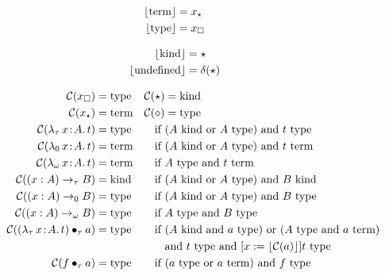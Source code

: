 
\begin{figure}
    \centering
    \begin{minipage}{0.5\textwidth}
        \begin{align*}
            \lfloor \!\!~\textnormal{term} \rfloor &= x_\star \\
            \lfloor \!\!~\textnormal{type} \rfloor &= x_\square
        \end{align*}
    \end{minipage}%
    \begin{minipage}{0.5\textwidth}
        \begin{align*}
            \lfloor \!\!~\textnormal{kind} \rfloor &= \star \\
            \lfloor \text{undefined} \rfloor &= \delta(\star)
        \end{align*}
    \end{minipage}
    \begin{align*}
        \mathcal{C}(x_\square) &=\!\! \ptype &\mathcal{C}(\star) &=\!\! \pkind\\
        \mathcal{C}(x_\star) &=\!\! \pterm &\mathcal{C}(\diamond) &=\!\! \ptype\\
        \mathcal{C}(\abs{\lambda_\tau}{x}{A}{t}) &=\!\! \ptype &\text{if }& (A\pkind \text{ or } A\ptype) \text{ and } t\ptype \\
        \mathcal{C}(\abs{\lambda_0}{x}{A}{t}) &=\!\! \pterm &\text{if }& (A\pkind \text{ or } A\ptype) \text{ and } t\pterm \\
        \mathcal{C}(\abs{\lambda_\omega}{x}{A}{t}) &=\!\! \pterm &\text{if }& A\ptype \text{ and } t\pterm \\
        \mathcal{C}((x : A) \to_\tau B) &=\!\! \pkind &\text{if }& (A\pkind \text{ or } A\ptype) \text{ and } B\pkind \\
        \mathcal{C}((x : A) \to_0 B) &=\!\! \ptype &\text{if }& (A\pkind \text{ or } A\ptype) \text{ and } B\ptype \\
        \mathcal{C}((x : A) \to_\omega B) &=\!\! \ptype &\text{if }& A\ptype \text{ and } B\ptype \\
        \mathcal{C}(\app{(\abs{\lambda_\tau}{x}{A}{t})}{\tau}{a}) &=\!\! \ptype &\text{if }& (A\pkind \text{ and } a\ptype) \text{ or } (A\ptype \text{ and } a\pterm) \\
            &&&\text{and } t\ptype \text{ and } [x := \ptrunc{\mathcal{C}(a)}]t\ptype \\
        \mathcal{C}(\app{f}{\tau}{a}) &=\!\! \ptype &\text{if }& (a\ptype \text{ or } a\pterm) \text{ and } f\ptype \\

\end{align*}
\end{figure}
